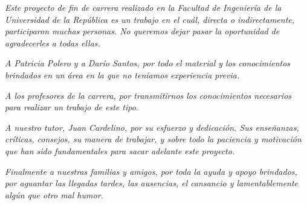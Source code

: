 \textit{Este proyecto de fin de carrera realizado en la Facultad de Ingeniería de la Universidad de la República es un trabajo en el cuál, directa o indirectamente, participaron muchas personas. No queremos dejar pasar la oportunidad de agradecerles a todas ellas.}

\vspace{3 mm}

\textit{A Patricia Polero y a Darío Santos, por todo el material y los conocimientos brindados en un área en la que no teníamos experiencia previa.}

\vspace{3 mm}

\textit{A los profesores de la carrera, por transmitirnos los conocimientos necesarios para realizar un trabajo de este tipo.}

\vspace{3 mm}

\textit{A nuestro tutor, Juan Cardelino, por su esfuerzo y dedicación. Sus enseñanzas, críticas, consejos, su manera de trabajar, y sobre todo la paciencia y motivación que han sido fundamentales para sacar adelante este proyecto.}

\vspace{3 mm}

\textit{Finalmente a nuestras familias y amigos, por toda la ayuda y apoyo brindados, por aguantar las llegadas tardes, las ausencias, el cansancio y lamentablemente algún que otro mal humor.  }